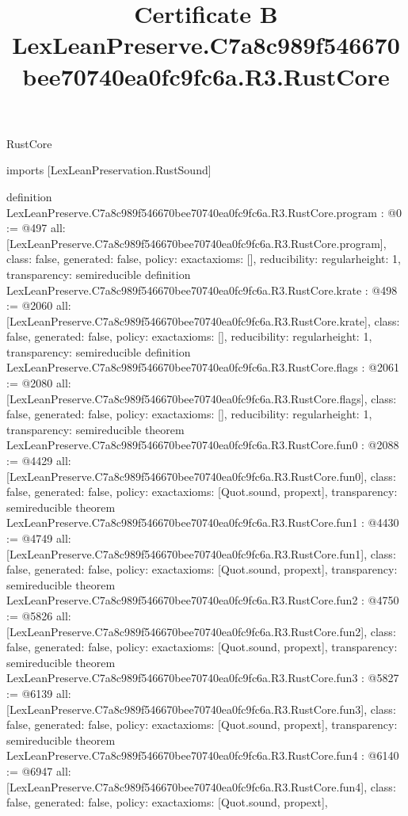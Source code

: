 \begin{lexlean}{RustCore}
\title{Certificate B LexLeanPreserve.C7a8c989f546670bee70740ea0fc9fc6a.R3.RustCore}
\begin{coremodule}
imports [LexLeanPreservation.RustSound]

definition LexLeanPreserve.C7a8c989f546670bee70740ea0fc9fc6a.R3.RustCore.program : @0 := @497 {
  all: [LexLeanPreserve.C7a8c989f546670bee70740ea0fc9fc6a.R3.RustCore.program],
  class: false,
  generated: false,
  policy: exact{axioms: []},
  reducibility: regular{height: 1},
  transparency: semireducible
}
definition LexLeanPreserve.C7a8c989f546670bee70740ea0fc9fc6a.R3.RustCore.krate : @498 := @2060 {
  all: [LexLeanPreserve.C7a8c989f546670bee70740ea0fc9fc6a.R3.RustCore.krate],
  class: false,
  generated: false,
  policy: exact{axioms: []},
  reducibility: regular{height: 1},
  transparency: semireducible
}
definition LexLeanPreserve.C7a8c989f546670bee70740ea0fc9fc6a.R3.RustCore.flags : @2061 := @2080 {
  all: [LexLeanPreserve.C7a8c989f546670bee70740ea0fc9fc6a.R3.RustCore.flags],
  class: false,
  generated: false,
  policy: exact{axioms: []},
  reducibility: regular{height: 1},
  transparency: semireducible
}
theorem LexLeanPreserve.C7a8c989f546670bee70740ea0fc9fc6a.R3.RustCore.fun0 : @2088 := @4429 {
  all: [LexLeanPreserve.C7a8c989f546670bee70740ea0fc9fc6a.R3.RustCore.fun0],
  class: false,
  generated: false,
  policy: exact{axioms: [Quot.sound, propext]},
  transparency: semireducible
}
theorem LexLeanPreserve.C7a8c989f546670bee70740ea0fc9fc6a.R3.RustCore.fun1 : @4430 := @4749 {
  all: [LexLeanPreserve.C7a8c989f546670bee70740ea0fc9fc6a.R3.RustCore.fun1],
  class: false,
  generated: false,
  policy: exact{axioms: [Quot.sound, propext]},
  transparency: semireducible
}
theorem LexLeanPreserve.C7a8c989f546670bee70740ea0fc9fc6a.R3.RustCore.fun2 : @4750 := @5826 {
  all: [LexLeanPreserve.C7a8c989f546670bee70740ea0fc9fc6a.R3.RustCore.fun2],
  class: false,
  generated: false,
  policy: exact{axioms: [Quot.sound, propext]},
  transparency: semireducible
}
theorem LexLeanPreserve.C7a8c989f546670bee70740ea0fc9fc6a.R3.RustCore.fun3 : @5827 := @6139 {
  all: [LexLeanPreserve.C7a8c989f546670bee70740ea0fc9fc6a.R3.RustCore.fun3],
  class: false,
  generated: false,
  policy: exact{axioms: [Quot.sound, propext]},
  transparency: semireducible
}
theorem LexLeanPreserve.C7a8c989f546670bee70740ea0fc9fc6a.R3.RustCore.fun4 : @6140 := @6947 {
  all: [LexLeanPreserve.C7a8c989f546670bee70740ea0fc9fc6a.R3.RustCore.fun4],
  class: false,
  generated: false,
  policy: exact{axioms: [Quot.sound, propext]},
}
\end{coremodule}
\end{lexlean}
